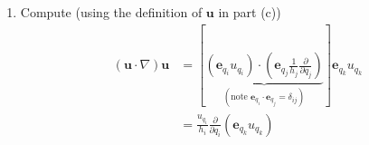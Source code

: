 \documentclass[a4paper]{article}
\begin{document}
\begin{enumerate}[label=(\alph*)]
\begin{align*}
																			   & = \frac{2}{r}\frac{\partial }{\partial r} + \frac{\cot\!\left(\theta\right)}{r^{2}}\frac{\partial }{\partial \theta} \\
		\pmb{e}_{q_{j}} \cdot \pmb{e}_{q_{k}}\!\left( \frac{1}{h_{j}}\frac{\partial \!\left( 1 / h_{k} \right)}{\partial q_{j}}\frac{\partial }{\partial q_{k}} \right) & = \frac{1}{h_{j}}\frac{\partial \!\left( 1 / h_{j} \right)}{\partial q_{j}}\frac{\partial }{\partial q_{j}} \\
																						& = -\frac{1}{h^{3}_{j}}\frac{\partial h_{j}}{\partial q_{j}}\frac{\partial }{\partial q_{j}} \\
																						& = 0 \\
		\pmb{e}_{q_{j}} \cdot \pmb{e}_{q_{k}}\frac{1}{h_{j}h_{k}}\frac{\partial^2 }{\partial q_{j} \partial q_{k}} & = \frac{1}{h^{2}_{j}}\frac{\partial^2 }{\partial q_{j}^2} \\
															   & = \frac{\partial^2 }{\partial r^2} + \frac{1}{r^{2}}\frac{\partial^2 }{\partial \theta^2} + \frac{1}{r^{2}\sin^{2}\!\left(\theta\right)}\frac{\partial^2 }{\partial \phi^2}
	\end{align*}
	Summing, conclude
	\begin{align*}
		\nabla^{2} & = \frac{\partial^2 }{\partial r^2} + \frac{2}{r}\frac{\partial }{\partial r} + \frac{1}{r^{2}}\frac{\partial^2 }{\partial \theta^2} + \frac{\cot\!\left(\theta\right)}{r^{2}}\frac{\partial }{\partial \theta} + \frac{1}{r^{2}\sin^{2}\!\left(\theta\right)}\frac{\partial^2 }{\partial \phi^2} \\
		 & = \frac{1}{r^{2}}\frac{\partial }{\partial r}\!\left( r^{2}\frac{\partial }{\partial r} \right) + \frac{1}{r^{2}\sin\!\left(\theta\right)}\frac{\partial }{\partial \theta}\!\left( \sin\!\left(\theta\right)\frac{\partial }{\partial \theta} \right) + \frac{1}{r^{2}\sin^{2}\!\left(\theta\right)}\frac{\partial^2 }{\partial \phi^2}
	\end{align*}
	\item Compute (using the definition of \( \pmb{u} \) in part (c))
	\begin{align*}
		\!\left( \pmb{u} \cdot \nabla \right)\pmb{u} & = \!\left[ \underbrace{\!\left( \pmb{e}_{q_{i}}u_{q_{i}} \right) \cdot \!\left( \pmb{e}_{q_{j}}\frac{1}{h_{j}}\frac{\partial }{\partial q_{j}} \right)}_{\!\left( \text{note } \pmb{e}_{q_{i}} \cdot \pmb{e}_{q_{j}} = \delta_{ij} \right)} \right]\pmb{e}_{q_{k}}u_{q_{k}} \\
		 & = \frac{u_{q_{i}}}{h_{i}}\frac{\partial }{\partial q_{i}}\!\left( \pmb{e}_{q_{k}}u_{q_{k}} \right) \\ 

\end{align*}
\end{enumerate}
\end{document}
